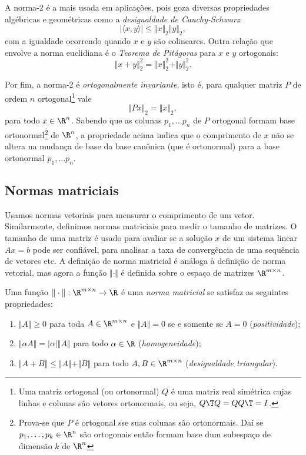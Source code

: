 \documentclass{article}
\begin{document}
A norma-2 é a mais usada em aplicações, pois goza diversas propriedades algébricas e geométricas como a \emph{desigualdade de Cauchy-Schwarz}:
\[
    |\langle x, y \rangle| \leq \Vert x \Vert_2 \Vert y \Vert_2,
\]
com a igualdade ocorrendo quando \(x\) e \(y\) são colineares. Outra relação que envolve a norma euclidiana é o \emph{Teorema de Pitágoras} para \(x\) e \(y\) ortogonais:
\[
    \Vert x + y \Vert_2^2 = \Vert x \Vert_2^2 + \Vert y \Vert_2^2.
\]

Por fim, a norma-2 é \emph{ortogonalmente invariante}, isto é, para qualquer matriz \(P\) de ordem \(n\) ortogonal\footnote{Uma matriz ortogonal (ou ortonormal) \(Q\) é uma matriz real simétrica cujas linhas e colunas são vetores ortonormais, ou seja, \(Q\T Q = Q Q\T = I\).} vale
\[
    \Vert Px \Vert_2 = \Vert x \Vert_2,
\]
para todo \(x \in \R^n\). Sabendo que as colunas \(p_1, \ldots p_n\) de \(P\) ortogonal formam base ortonormal\footnote{Prova-se que \(P\) é ortogonal sse suas colunas são ortonormais. Daí se \(p_1, \ldots, p_k \in \R^n\) são ortogonais então formam base dum subespaço de dimensão \(k\) de \(\R^n\)} de \(\R^n\), a propriedade acima indica que o comprimento de \(x\) não se altera na mudança de base da base canônica (que é ortonormal) para a base ortonormal \(p_1, \ldots p_n\).

\subsection{Normas matriciais}

Usamos normas vetoriais para mensurar o comprimento de um vetor. Similarmente, definimos normas matriciais para medir o tamanho de matrizes. O tamanho de uma matriz é usado para avaliar se a solução \(x\) de um sistema linear \(Ax = b\) pode ser confiável, para analisar a taxa de convergência de uma sequência de vetores etc. A definição de norma matricial é análoga à definição de norma vetorial, mas agora a função \(\Vert \cdot \Vert\) é definida sobre o espaço de matrizes \(\R^{m \times n}\).

\begin{defn}
    Uma função \(\Vert \cdot \Vert : \R^{m \times n} \to \R\) é uma \emph{norma matricial} se satisfaz as seguintes propriedades:
    \begin{enumerate}
        \item \(\Vert A \Vert \geq 0\) para toda \(A \in \R^{m \times n}\) e \(\Vert A \Vert = 0\) se e somente se \(A = 0\) (\emph{positividade});
        \item \(\Vert \alpha A \Vert = |\alpha| \Vert A \Vert\) para todo \(\alpha \in \R\) (\emph{homogeneidade});
        \item \(\Vert A + B \Vert \leq \Vert A \Vert + \Vert B \Vert\) para todo \(A, B \in \R^{m \times n}\) (\emph{desigualdade triangular}).
    \end{enumerate}
\end{defn}
\end{document}
